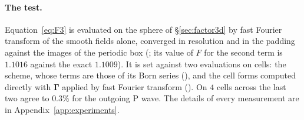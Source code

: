 \documentclass[11pt,a4paper]{article}
\begin{document}
\paragraph{The test.} Equation~\eqref{eq:F3} is evaluated on the sphere of \S\ref{sec:factor3d} by fast
Fourier transform of the smooth fields alone, converged in resolution and in the padding against the
images of the periodic box (; its value of $F$ for the second
term is $1.1016$ against the exact $1.1009$). It is set against two evaluations on cells: the scheme,
whose terms are those of its Born series (), and the cell forms
computed directly with $\boldsymbol\Gamma$ applied by fast Fourier transform
(). On $4$ cells across the last two agree to $0.3\%$ for the
outgoing P wave. The details of every measurement are in Appendix~\ref{app:experiments}.
\end{document}
